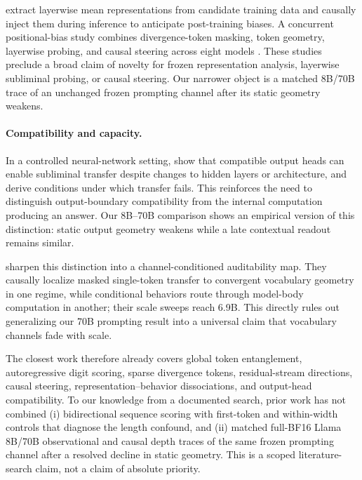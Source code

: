 \citet{wang2026data2behavior} extract layerwise mean representations from
candidate training data and causally inject them during inference to anticipate
post-training biases. A concurrent positional-bias study combines
divergence-token masking, token geometry, layerwise probing, and causal steering
across eight models \citep{positional2026}. These studies preclude a broad claim
of novelty for frozen representation analysis, layerwise subliminal probing, or
causal steering. Our narrower object is a matched 8B/70B trace of an unchanged
frozen prompting channel after its static geometry weakens.

\paragraph{Compatibility and capacity.}
In a controlled neural-network setting, \citet{brockers2026noise} show that
compatible output heads can enable subliminal transfer despite changes to hidden
layers or architecture, and derive conditions under which transfer fails. This
reinforces the need to distinguish output-boundary compatibility from the
internal computation producing an answer. Our 8B--70B comparison shows an
empirical version of this distinction: static output geometry weakens while a
late contextual readout remains similar.

\citet{madl2026channel} sharpen this distinction into a channel-conditioned
auditability map. They causally localize masked single-token transfer to
convergent vocabulary geometry in one regime, while conditional behaviors route
through model-body computation in another; their scale sweeps reach 6.9B. This
directly rules out generalizing our 70B prompting result into a universal claim
that vocabulary channels fade with scale.

The closest work therefore already covers global token entanglement,
autoregressive digit scoring, sparse divergence tokens, residual-stream
directions, causal steering, representation--behavior dissociations, and
output-head compatibility. To our knowledge from a documented search, prior
work has not combined (i) bidirectional sequence scoring with first-token and
within-width controls that diagnose the length confound, and (ii) matched
full-BF16 Llama 8B/70B observational and causal depth traces of the same frozen
prompting channel after a resolved decline in static geometry. This is a scoped
literature-search claim, not a claim of absolute priority.
